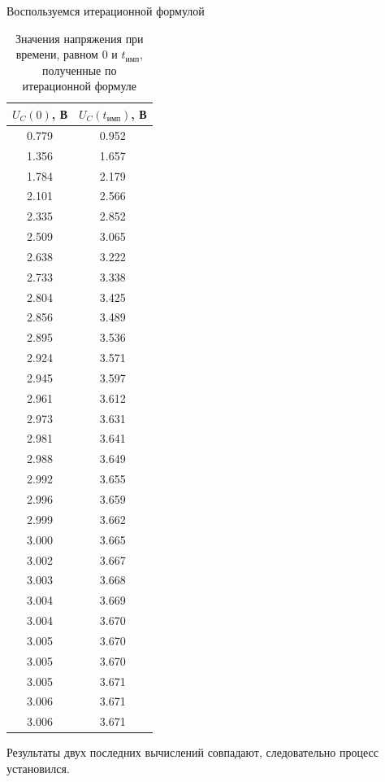 	Воспользуемся итерационной формулой
\begin{table}[H]

	\begin{center}
	\caption{Значения напряжения при времени, равном $0$ и $t_\text{имп}$, полученные по итерационной формуле}
	\begin{tabular}{|c|c|}
		\hline 
		$U_C(0)$, В & $U_C(t_\text{имп})$, В \\ 
		\hline 
		0.779 & 0.952 \\ 
		\hline 
		1.356 & 1.657 \\ 
		\hline 
		1.784 & 2.179 \\ 
		\hline 
		2.101 & 2.566 \\ 
		\hline 
		2.335 & 2.852 \\ 
		\hline 
		2.509 & 3.065 \\ 
		\hline 
		2.638 & 3.222 \\ 
		\hline 
		2.733 & 3.338 \\ 
		\hline 
		2.804 & 3.425 \\ 
		\hline 
		2.856 & 3.489 \\ 
		\hline 
		2.895 & 3.536 \\ 
		\hline 
		2.924 & 3.571 \\ 
		\hline 
		2.945 & 3.597 \\ 
		\hline 
		2.961 & 3.612 \\ 
		\hline 
		2.973 & 3.631 \\ 
		\hline 
		2.981 & 3.641 \\ 
		\hline 
		2.988 & 3.649 \\ 
		\hline 
		2.992 & 3.655 \\ 
		\hline 
		2.996 & 3.659 \\ 
		\hline 
		2.999 & 3.662 \\ 
		\hline 
		3.000 & 3.665 \\ 
		\hline 
		3.002 & 3.667 \\ 
		\hline 
		3.003 & 3.668 \\ 
		\hline 
		3.004 & 3.669 \\ 
		\hline 
		3.004 & 3.670 \\ 
		\hline 
		3.005 & 3.670 \\ 
		\hline 
		3.005 & 3.670 \\ 
		\hline 
		3.005 & 3.671 \\ 
		\hline 
		3.006 & 3.671 \\ 
		\hline 
		3.006 & 3.671 \\ 
		\hline 
		\end{tabular}  	
		
	\end{center}
\end{table}
	Результаты двух последних вычислений совпадают, следовательно процесс установился.\\
	
